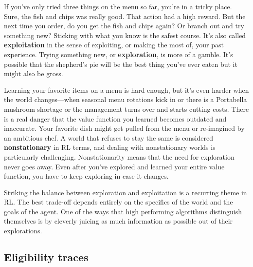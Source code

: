If you’ve only tried three things on the menu so far, you're in a
tricky place. Sure, the fish and chips was really good. That action had a
high reward. But the next time you order, do you get the fish and chips again?
Or branch out and try something new? Sticking with what you know is
the safest course. It's also called \textbf{exploitation} in the sense of
exploiting, or making the most of, your past experience. Trying something new,
or \textbf{exploration}, is more of a gamble. It's possible that the
shepherd's pie will be the best thing you've ever eaten but it might
also be gross.

Learning your favorite items on a menu is hard enough, but it's even
harder when the world changes---when seasonal menu rotations kick in or
there is a Portabella mushroom shortage or the management turns over and starts
cutting costs. There is a real danger that the value function you
learned becomes outdated and inaccurate. Your favorite dish might get
pulled from the menu or re-imagined by an ambitious chef. A world that
refuses to stay the same is considered \textbf{nonstationary} in RL terms,
and dealing with nonstationary worlds is particularly challenging.
Nonstationarity means that the need for exploration never goes away.
Even after you've explored and learned your entire value function,
you have to keep exploring in case it changes.

Striking the balance between exploration and exploitation is a recurring
theme in RL. The best trade-off depends entirely on the specifics of the
world and the goals of the agent. One of the ways that high performing
algorithms distinguish themselves is by cleverly juicing as much information
as possible out of their explorations. 


\subsection{Eligibility traces}
\label{subsec:introeligibility}

